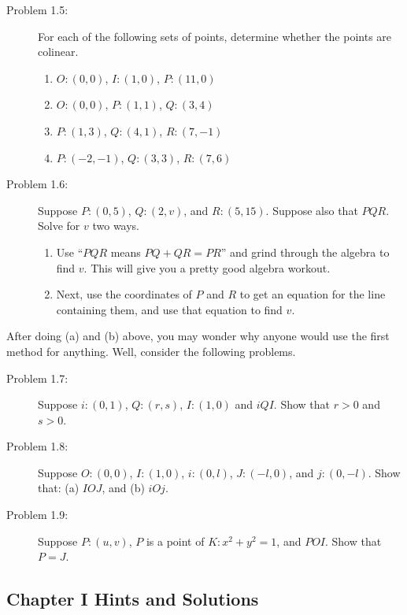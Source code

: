 \documentclass[english]{book}
\begin{document}
\begin{description}
\item[Problem 1.5:] For each of the following sets of points, determine whether the points are colinear.
  \begin{enumerate}[\hspace{1cm}(a)]
    \item $O: (0,0)$, $I: (1,0)$, $P: (11,0)$
    \item $O: (0,0)$, $P: (1,1)$, $Q: (3,4)$
    \item $P: (1,3)$, $Q: (4,1)$, $R: (7,-1)$
    \item $P: (-2,-1)$, $Q: (3,3)$, $R: (7,6)$
  \end{enumerate}

\item[Problem 1.6:] Suppose $P:(0,5)$, $Q:(2,v)$, and $R:(5,15)$. Suppose also that $PQR$. Solve for $v$ two ways.
  \begin{enumerate}[\hspace{1cm}(a)]
    \item Use ``$PQR$ means $PQ+QR = PR$'' and grind through the algebra to find $v$. This will give you a pretty good algebra workout.
    \item Next, use the coordinates of $P$ and $R$ to get an equation for the line containing them, and use that equation to find $v$.
  \end{enumerate}

\end{description}

After doing (a) and (b) above, you may wonder why anyone would use the first method for anything. Well, consider the following problems.

\begin{description}

\item[Problem 1.7:] Suppose $i: (0,1)$, $Q: (r,s)$, $I: (1,0)$ and $iQI$. Show that $r>0$ and $s>0$.

\item[Problem 1.8:] Suppose $O:(0,0)$, $I:(1,0)$, $i:(0,l)$, $J:(-l,0)$, and $j:(0,-l)$. Show that: (a) $IOJ$, and (b) $iOj$.

\item[Problem 1.9:] Suppose $P:(u,v)$, $P$ is a point of $K:x^{2} + y^{2} = 1$, and $POI$. Show that $P=J$.

\end{description}



\newpage
\begin{center}
\section*{Chapter I Hints and Solutions}
\end{center}
\end{document}
